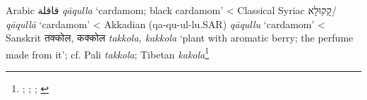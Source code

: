 \begin{etymology}\label{ety:qaqulla}
Arabic {قاقلة} \textit{qāqulla} `cardamom; black cardamom'
< Classical Syriac {{קָקוּלָא}/} \textit{qāqullā} `cardamom'
< Akkadian { (qa-qu-ul-lu.SAR)} \textit{qāqullu} `cardamom'
< Sanskrit {तक्कोल, कक्कोल} \textit{takkola, kakkola} `plant with aromatic berry; the perfume made from it'; cf. Pali \textit{takkola}; Tibetan  \textit{kakola}\footnote{\textcite[863]{wehr_dictionary_1976}; \textcite[vol. 1, p. 489]{low_flora_1924}; \textcite[58]{zimmern_akkadische_1915}; \textcite[431, 241]{monier-williams_sanskrit-english_1899}}
\end{etymology}